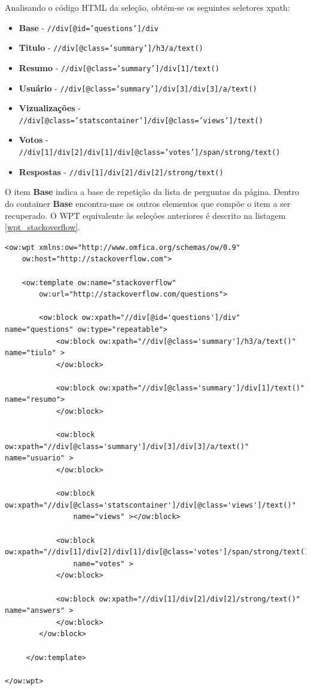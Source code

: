 Analisando o código HTML da seleção, obtém-se os seguintes seletores \gls{xpath}:

\begin{itemize}
	\item \textbf{Base} - \texttt{//div[@id='questions']/div}
	\item \textbf{Titulo} - \texttt{//div[@class='summary']/h3/a/text()}
	\item \textbf{Resumo} - \texttt{//div[@class='summary']/div[1]/text()}
	\item \textbf{Usuário} - \texttt{//div[@class='summary']/div[3]/div[3]/a/text()}
	\item \textbf{Vizualizações} - \texttt{//div[@class='statscontainer']/div[@class='views']/text()}
	\item \textbf{Votos} - \texttt{//div[1]/div[2]/div[1]/div[@class='votes']/span/strong/text()}
	\item \textbf{Respostas} - \texttt{//div[1]/div[2]/div[2]/strong/text()}
\end{itemize}

O item \textbf{Base} indica a base de repetição da lista de perguntas da página. Dentro do container \textbf{Base} encontra-mse os outros elementos que compõe o item a ser recuperado. O WPT equivalente às seleções anteriores é descrito na listagem \ref{wpt_stackoverflow}.

\begin{lstlisting}[label=wpt_stackoverflow]
<ow:wpt xmlns:ow="http://www.omfica.org/schemas/ow/0.9"
    ow:host="http://stackoverflow.com">
      
    <ow:template ow:name="stackoverflow" 
        ow:url="http://stackoverflow.com/questions">
       
        <ow:block ow:xpath="//div[@id='questions']/div" name="questions" ow:type="repeatable"> 
            <ow:block ow:xpath="//div[@class='summary']/h3/a/text()" name="tiulo" >
            </ow:block>
            
            <ow:block ow:xpath="//div[@class='summary']/div[1]/text()" name="resumo"> 
            </ow:block>
            
            <ow:block ow:xpath="//div[@class='summary']/div[3]/div[3]/a/text()" name="usuario" >
            </ow:block>

            <ow:block ow:xpath="//div[@class='statscontainer']/div[@class='views']/text()" 
                name="views" ></ow:block>

            <ow:block ow:xpath="//div[1]/div[2]/div[1]/div[@class='votes']/span/strong/text()" 
                name="votes" >
            </ow:block>

            <ow:block ow:xpath="//div[1]/div[2]/div[2]/strong/text()" name="answers" >
            </ow:block>
        </ow:block>
              
     </ow:template> 

</ow:wpt>
\end{lstlisting}


